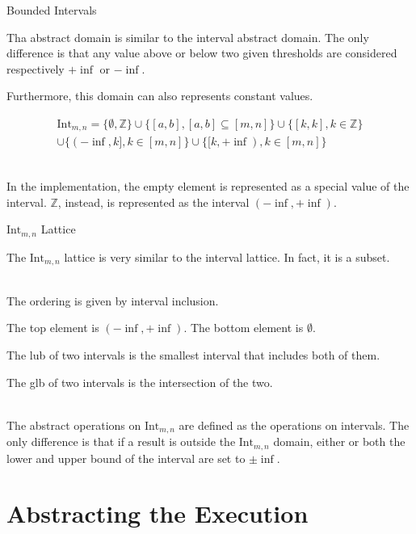 \documentclass{beamer}
\begin{document}
\begin{frame}{Bounded Intervals}

    Tha abstract domain is similar to the interval abstract domain.
    The only difference is that any value above or below two given thresholds are considered respectively $+\inf$ or $-\inf$.

    Furthermore, this domain can also represents constant values.

    \begin{multline*}
        \textrm{Int}_{m,n} = \{ \emptyset, \mathbb{Z} \}
        \cup \{ [a, b], [a, b] \subseteq [m, n] \}
        \cup \{ [k, k], k \in \mathbb{Z} \} \\
        \cup \{ (-\inf, k], k \in [m, n] \}
        \cup \{ [k, +\inf), k \in [m, n] \}
    \end{multline*}

    ~\\
    In the implementation, the empty element is represented as a special value of the interval.
    $\mathbb{Z}$, instead, is represented as the interval $(-\inf, +\inf)$.

\end{frame}

\begin{frame}{$\textrm{Int}_{m,n}$ Lattice}

    The $\textrm{Int}_{m,n}$ lattice is very similar to the interval lattice.
    In fact, it is a subset.

    ~\\

    The ordering is given by interval inclusion.

    The top element is $(-\inf, +\inf)$.
    The bottom element is $\emptyset$.

    The lub of two intervals is the smallest interval that includes both of them.

    The glb of two intervals is the intersection of the two.

    ~\\

    The abstract operations on $\textrm{Int}_{m,n}$ are defined as the operations on intervals.
    The only difference is that if a result is outside the $\textrm{Int}_{m,n}$ domain, either or both the lower and upper bound of the interval are set to $\pm \inf$.

\end{frame}

\section{Abstracting the Execution}
\end{document}
